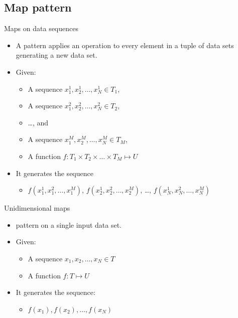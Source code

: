 \subsection{Map pattern}

\begin{frame}[t]{Maps on data sequences}
\begin{itemize}
  \item A  pattern applies an operation to every element in a
        tuple of data sets generating a new data set.
  \vfill
  \item Given:
    \begin{itemize}
      \item A sequence $x^1_1, x^1_2, \ldots, x^1_N \in T_1$,
      \item A sequence $x^2_1, x^2_2, \ldots, x^2_N \in T_2$,
      \item \ldots, and
      \item A sequence $x^M_1,  x^M_2, \ldots, x^M_N \in T_M$,
      \item A function $f : T_1 \times T_2 \times \ldots \times T_M \mapsto U$
    \end{itemize}
  \vfill
  \item It generates the sequence
    \begin{itemize}
      \item $f(x^1_1, x^2_1, \ldots, x^M_1)$,
      $f(x^1_2, x^2_2, \ldots, x^M_2)$,
      \ldots,
      $f(x^1_N, x^2_N, \ldots, x^M_N)$
    \end{itemize}
\end{itemize}
\end{frame}

\begin{frame}[t]{Unidimensional maps}
\begin{itemize}
  \item {} pattern on a single input data set.
  \vfill
  \item Given:
    \begin{itemize}
      \item A sequence $x_1, x_2, \ldots, x_N \in T$
      \item A function $f: T \mapsto U$
    \end{itemize}
  \vfill
  \item It generates the sequence:
    \begin{itemize}
      \item $f(x_1), f(x_2), \ldots, f(x_N)$
    \end{itemize}
\end{itemize}
\end{frame}


